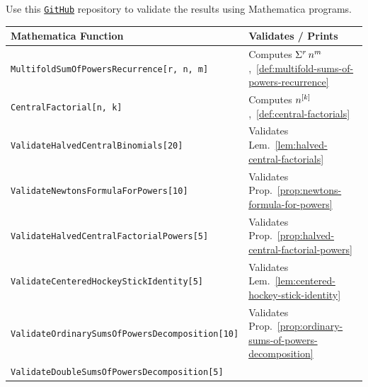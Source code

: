 Use this
\href{https://github.com/kolosovpetro/AFormulaForSumsOfPowersViaCentralNewtonsInterpolation}
{\texttt{GitHub}}
repository to validate the results using Mathematica programs.
\\
\begin{center}
  \renewcommand{\arraystretch}{1.3}
  \begin{tabular}{ll}
    \toprule
    \textbf{Mathematica Function} & \textbf{Validates / Prints}  \\
    \midrule
    \texttt{MultifoldSumOfPowersRecurrence[r, n, m]}
    & Computes $\Sigma^{r}\,{n}^{m}$,~\eqref{def:multifold-sums-of-powers-recurrence} \\
    \texttt{CentralFactorial[n, k]}
    & Computes $n^{[k]}$,~\eqref{def:central-factorials} \\
    \texttt{ValidateHalvedCentralBinomials[20]}
    & Validates Lem.~\eqref{lem:halved-central-factorials} \\
    \texttt{ValidateNewtonsFormulaForPowers[10]}
    & Validates Prop.~\eqref{prop:newtons-formula-for-powers} \\
    \texttt{ValidateHalvedCentralFactorialPowers[5]}
    & Validates Prop.~\eqref{prop:halved-central-factorial-powers} \\
    \texttt{ValidateCenteredHockeyStickIdentity[5]}
    & Validates Lem.~\eqref{lem:centered-hockey-stick-identity} \\
    \texttt{ValidateOrdinarySumsOfPowersDecomposition[10]}
    & Validates Prop.~\eqref{prop:ordinary-sums-of-powers-decomposition} \\
    \texttt{ValidateDoubleSumsOfPowersDecomposition[5]}

\end{tabular}
\end{center}
